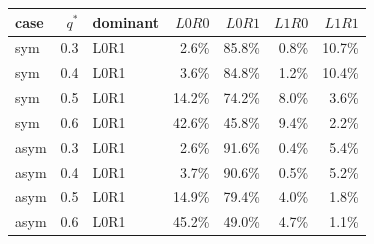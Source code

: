 \begin{tabular}{lrlrrrr}
\toprule
case & $q^*$ & dominant & $L0R0$ & $L0R1$ & $L1R0$ & $L1R1$ \\
\midrule
sym & 0.3 & L0R1 & 2.6\% & 85.8\% & 0.8\% & 10.7\% \\
sym & 0.4 & L0R1 & 3.6\% & 84.8\% & 1.2\% & 10.4\% \\
sym & 0.5 & L0R1 & 14.2\% & 74.2\% & 8.0\% & 3.6\% \\
sym & 0.6 & L0R1 & 42.6\% & 45.8\% & 9.4\% & 2.2\% \\
asym & 0.3 & L0R1 & 2.6\% & 91.6\% & 0.4\% & 5.4\% \\
asym & 0.4 & L0R1 & 3.7\% & 90.6\% & 0.5\% & 5.2\% \\
asym & 0.5 & L0R1 & 14.9\% & 79.4\% & 4.0\% & 1.8\% \\
asym & 0.6 & L0R1 & 45.2\% & 49.0\% & 4.7\% & 1.1\% \\
\bottomrule
\end{tabular}
